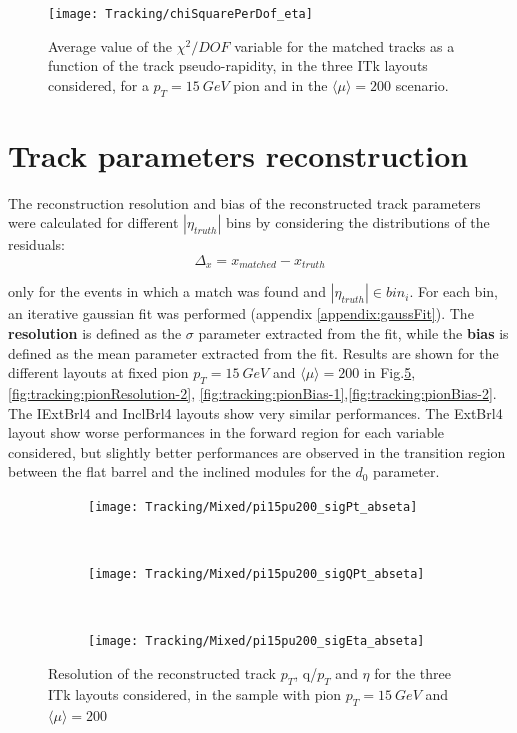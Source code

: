 \documentclass[a4paper,twoside,12pt]{book}
\begin{document}
\begin{figure}
\centering
\texttt{[image: Tracking/chiSquarePerDof\_eta]}
\caption{Average value of the $\chi^{2}/DOF$ variable for the matched tracks as a function of the track pseudo-rapidity, in the three ITk layouts considered, for a $p_{T} = 15\ GeV$ pion
and in the $\langle\mu\rangle = 200$ scenario.}
\label{fig:tracking:chiSqPerDof_eta}
\end{figure}

\section{Track parameters reconstruction}\label{sec:tracking:resolution}
The reconstruction resolution and bias of the reconstructed track parameters were calculated for different $|\eta_{truth}|$ bins by considering the distributions of the residuals:\\
$$
\Delta_{x} = x_{matched} - x_{truth}
$$

only for the events in which a match was found and $|\eta_{truth}| \in bin_{i}$. For each bin, an iterative gaussian fit was performed (appendix \ref{appendix:gaussFit}). The \textbf{resolution}
is defined as the $\sigma$ parameter extracted from the fit, while the \textbf{bias} is defined as the mean parameter extracted from the fit. Results are shown for the different layouts at
fixed pion $p_{T} = 15\ GeV$ and $\langle\mu\rangle = 200$ in Fig.\ref{fig:tracking:pionResolution-1},\ref{fig:tracking:pionResolution-2}, \ref{fig:tracking:pionBias-1},\ref{fig:tracking:pionBias-2}. The IExtBrl4 and InclBrl4 layouts show very similar
performances. The ExtBrl4 layout show worse performances in the forward region for
each variable considered, but slightly better performances are observed in the transition
region between the flat barrel and the inclined modules for the $d_{0}$ parameter. \\

\begin{figure}
\begin{subfigure}{\linewidth}
\centering
\texttt{[image: Tracking/Mixed/pi15pu200\_sigPt\_abseta]}
\caption{}
\label{fig:tracking:pi15pu200_sigPt_abseta}
\end{subfigure}\\[1ex]
\begin{subfigure}{\linewidth}
\centering
\texttt{[image: Tracking/Mixed/pi15pu200\_sigQPt\_abseta]}
\caption{}
\label{fig:tracking:pi15pu200_sigQPt_abseta}
\end{subfigure}\\[1ex]
\begin{subfigure}{\linewidth}
\centering
\texttt{[image: Tracking/Mixed/pi15pu200\_sigEta\_abseta]}
\caption{}
\label{fig:tracking:pi15pu200_sigEta_abseta}
\end{subfigure}
\caption{Resolution of the reconstructed track $p_{T}$, q/$p_{T}$ and $\eta$ for the three ITk layouts considered, in the sample with pion $p_{T} = 15\ GeV$ and $\langle\mu\rangle = 200$}
\label{fig:tracking:pionResolution-1}
\end{figure}
\end{document}
